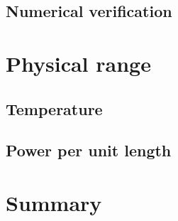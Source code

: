 
\subsection{Numerical verification}
\label{sec:bipolar.tracing.verification}


\section{Physical range}
\label{sec:bipolar.physical}


\subsection{Temperature}
\label{sec:bipolar.physical.temperature}


\subsection{Power per unit length}
\label{sec:bipolar.physical.power}


\section{Summary}
\label{sec:bipolar.summary}

